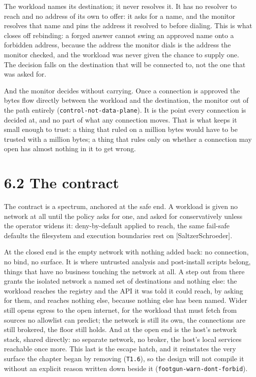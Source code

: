 The workload names its destination; it never resolves it. It has no
resolver to reach and no address of its own to offer: it asks for a
name, and the monitor resolves that name and pins the address it
resolved to before dialing. This is what closes off rebinding: a forged
answer cannot swing an approved name onto a forbidden address, because
the address the monitor dials is the address the monitor checked, and
the workload was never given the chance to supply one. The decision
falls on the destination that will be connected to, not the one that was
asked for.

And the monitor decides without carrying. Once a connection is approved
the bytes flow directly between the workload and the destination, the
monitor out of the path entirely (\texttt{control-not-data-plane}). It
is the point every connection is decided at, and no part of what any
connection moves. That is what keeps it small enough to trust: a thing
that ruled on a million bytes would have to be trusted with a million
bytes; a thing that rules only on whether a connection may open has
almost nothing in it to get wrong.

\hypertarget{the-contract}{%
\section{6.2 The contract}\label{the-contract}}

The contract is a spectrum, anchored at the safe end. A workload is
given no network at all until the policy asks for one, and asked for
conservatively unless the operator widens it: deny-by-default applied to
reach, the same fail-safe defaults the filesystem and execution
boundaries rest on {[}SaltzerSchroeder{]}.

At the closed end is the empty network with nothing added back: no
connection, no bind, no surface. It is where untrusted analysis and
post-install scripts belong, things that have no business touching the
network at all. A step out from there grants the isolated network a
named set of destinations and nothing else: the workload reaches the
registry and the API it was told it could reach, by asking for them, and
reaches nothing else, because nothing else has been named. Wider still
opens egress to the open internet, for the workload that must fetch from
sources no allowlist can predict; the network is still its own, the
connections are still brokered, the floor still holds. And at the open
end is the host's network stack, shared directly: no separate network,
no broker, the host's local services reachable once more. This last is
the escape hatch, and it reinstates the very surface the chapter began
by removing (\texttt{T1.6}), so the design will not compile it without
an explicit reason written down beside it
(\texttt{footgun-warn-dont-forbid}).

